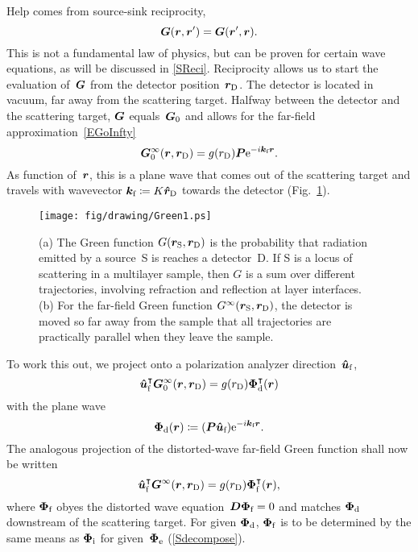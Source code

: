 Help comes from source-sink reciprocity,
%
%
\begin{equation}\label{Erecip}
  \TG(\r,\r') = \TG(\r',\r).
\end{equation}
This is not a fundamental law of physics,
but can be proven for certain wave equations, as will be discussed in \cref{SReci}.
Reciprocity allows us to start the evaluation of~$\bm{G}$ from the detector position~$\bm{r}_\text{D}$.
The detector is located in vacuum, far away from the scattering target.
Halfway between the detector and the scattering target,
$\bm{G}$ equals~$\bm{G}_0$
and allows for the far-field approximation~\cref{EGoInfty}
\begin{equation}\label{EGhalfway1}
  \TGo^\infty(\r,\rD)
  = g(r_\text{D}) \v{P}  \e^{-i\k_\sf\r}.
\end{equation}
As function of~$\bm{r}$, this is a plane wave that comes out of the scattering target
and travels with wavevector ${\bm{k}}_{\text{f}}\coloneqq K \bm{\hat r}_\text{D}$ towards the detector
(Fig.~\ref{Fgreen1}).
\begin{figure}[tb]
\begin{center}
\texttt{[image: fig/drawing/Green1.ps]}
\end{center}
\caption{(a)
The Green function $G(\bm{r}_\text{S},\bm{r}_\text{D})$
%
is the probability that radiation emitted
by a source~S is reaches a detector~D.
If S is a locus of scattering in a multilayer sample,
then $G$ is a sum over different trajectories,
involving refraction and reflection
at layer interfaces.
(b) For the far-field
%
Green function $G^\infty(\bm{r}_\text{S},\bm{r}_\text{D})$,
the detector is moved so far away from the sample
that all trajectories are practically parallel when they leave the sample.}
\label{Fgreen1}
\end{figure}
To work this out,
we project onto a polarization analyzer direction~${\bm{\hat u}}_{\text{f}}$,
\begin{equation}
  {\bm{\hat u}}_{\text{f}}^\intercal \bm{G}_0^\infty(\bm{r},\bm{r}_\text{D})
  = g(r_\text{D}) \bm{\Phi}_\text{d}^\intercal(\bm{r})
\end{equation}
with the plane wave
\begin{equation}
  \bm{\Phi}_\text{d}(\bm{r}) \coloneqq (\bm{P}{\bm{\hat u}}_{\text{f}})\mathrm e^{-i{\bm{k}}_{\text{f}}\bm{r}}.
\end{equation}
The analogous projection of the distorted-wave far-field Green function shall now be written
\begin{equation}
  {\bm{\hat u}}_{\text{f}}^\intercal \bm{G}^\infty(\bm{r},\bm{r}_\text{D})
  = g(r_\text{D}) \bm{\Phi}_{\text{f}}^\intercal(\bm{r}),
\end{equation}
where $\bm{\Phi}_{\text{f}}$ obyes the distorted wave equation~$\bm{D}\bm{\Phi}_{\text{f}}=0$
and matches $\bm{\Phi}_\text{d}$ downstream of the scattering target.
For given $\bm{\Phi}_\text{d}$,
$\bm{\Phi}_{\text{f}}$ is to be determined by the same means
as $\bm{\Phi}_{\text{i}}$ for given~$\bm{\Phi}_\text{e}$ (\cref{Sdecompose}).

